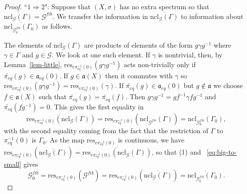 \documentclass[10pt,a4paper]{amsart}
\numberwithin{equation}{section}
\newcommand{\Gg}{{\mathcal G}}
\newcommand{\aut}{{\mathfrak a}}
\newcommand{\aute}{\aut_{eq}}
\newcommand{\pe}{\pi_{eq}}
\newcommand{\tpe}{\widetilde{\pe}}
\newcommand{\res}{\mathrm{res}}
\begin{document}
\begin{proof}
``$1 \Rightarrow 2$":
Suppose that $(X,\sigma)$ has no  extra spectrum so that  $\overline{\text{ncl}_{\Gg}(\Gamma)}=\Gg^{fib}$.  We transfer the information in $\overline{\text{ncl}_{\Gg}(\Gamma)}$ to information about  $\overline{\text{ncl}_{\Gg^{fib}_0}(\Gamma_0)} $ as follows.

 
    The elements of $\text{ncl}_{\Gg}(\Gamma)$ are products of elements of the form $g \gamma g^{-1}$ where $\gamma\in \Gamma$ and $g\in\Gg$. We look at one such element. If $\gamma$ is nontrivial, then, by Lemma~\ref{lem-little},
    $\res_{e\pe^{-1}(0) }(g \gamma g^{-1})$ acts non-trivially only if $\tpe(g)\in \aute(0)$.  If $g \in \aut(X)$ then it commutes with $\gamma$ so $  \res_{e\pe^{-1}(0) }(g \gamma g^{-1}) = \res_{e\pe^{-1}(0) }( \gamma )$. If $\tpe(g)\in \aute(0)$ but 
 $g\notin\aut$ we choose $f\in\aut(X)$ such that $\tpe(g)=\tpe(f)$. Then  $g \gamma g^{-1} = g  f ^{-1}\gamma f g^{-1}$ and $\tpe(fg^{-1})=0$. This gives the first equality in
    \begin{equation}\label{eq:big-to-small}\res_{e\pe^{-1}(0) }(\text{ncl}_{\Gg}(\Gamma))=\res_{e\pe^{-1}(0) }(      \text{ncl}_{\Gg^{fib}}(\Gamma)                     )=             \text{ncl}_{\Gg^{fib}_0}(\Gamma_0)       ,\end{equation} with the second equality coming from the fact that the restriction of $\Gamma$ to $\pe^{-1}(0)$  is $\Gamma_0$.
     As the map $\res_{e\pe^{-1}(0) }$ is continuous, we have $\res_{e\pe^{-1}(0) }(\overline{\text{ncl}_{\Gg}(\Gamma)})= \overline{\res_{e\pe^{-1}(0) }(\text{ncl}_{\Gg}(\Gamma))}$, so that (1) 
 and ~\eqref{eq:big-to-small} gives
    $$ \Gg^{fib}_0 = \res_{e\pe^{-1}(0) }(   \Gg^{fib}      )= \res_{e\pe^{-1}(0) }(\overline{\text{ncl}_{\Gg}(\Gamma)})=    \overline{ \text{ncl}_{\Gg^{fib}_0}(\Gamma_0)}.$$  
        
       


\end{proof}
\end{document}
